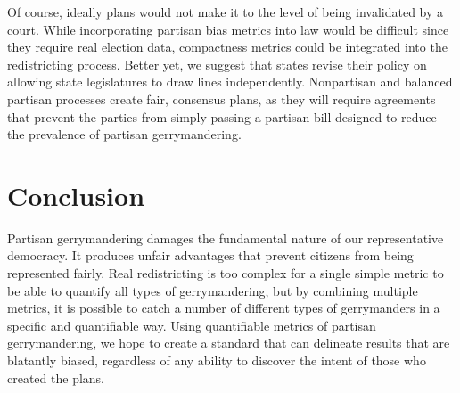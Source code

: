 \documentclass[12pt]{article}
\begin{document}
  Of course, ideally plans would not make it to the level of being invalidated by a court.  While incorporating partisan bias metrics into law would be difficult since they require real election data, compactness metrics could be integrated into the redistricting process.  Better yet, we suggest that states revise their policy on allowing state legislatures to draw lines independently.  Nonpartisan and balanced partisan processes create fair, consensus plans, as they will require agreements that prevent the parties from simply passing a partisan bill designed to reduce the prevalence of partisan gerrymandering.

  \section{Conclusion}
  Partisan gerrymandering damages the fundamental nature of our representative democracy.  It produces unfair advantages that prevent citizens from being represented fairly.  Real redistricting is too complex for a single simple metric to be able to quantify all types of gerrymandering, but by combining multiple metrics, it is possible to catch a number of different types of gerrymanders in a specific and quantifiable way.  Using quantifiable metrics of partisan gerrymandering, we hope to create a standard that can delineate results that are blatantly biased, regardless of any ability to discover the intent of those who created the plans.


  \singlespacing{}

  \printbibliography{}
\end{document}
